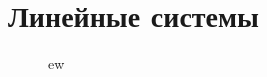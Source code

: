 \documentclass[12pt, a4paper]{article}
\begin{document}
    \tableofcontents

    \newpage

    \part{Линейные системы}    

    \newpage

    

\begin{figure}[ht]
    \centering
    \caption{ew}
    \label{fig:ew}
\end{figure}
\end{document}
